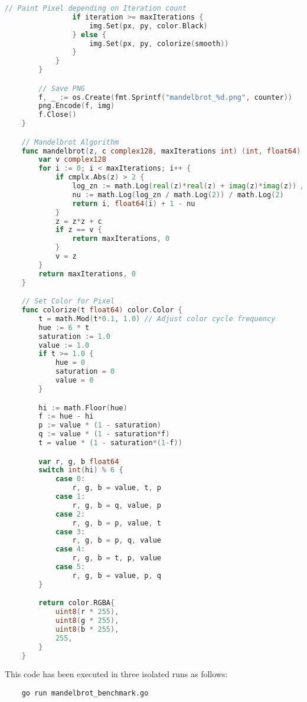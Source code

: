 \begin{lstlisting}[language=go, frame=tb, caption={Mandelbrot Set Calculation}]
                // Paint Pixel depending on Iteration count
                if iteration >= maxIterations {
                    img.Set(px, py, color.Black)
                } else {
                    img.Set(px, py, colorize(smooth))
                }
            }
        }

        // Save PNG
        f, _ := os.Create(fmt.Sprintf("mandelbrot_%d.png", counter))
        png.Encode(f, img)
        f.Close()
    }

    // Mandelbrot Algorithm
    func mandelbrot(z, c complex128, maxIterations int) (int, float64) {
        var v complex128
        for i := 0; i < maxIterations; i++ {
            if cmplx.Abs(z) > 2 {
                log_zn := math.Log(real(z)*real(z) + imag(z)*imag(z)) / 2
                nu := math.Log(log_zn / math.Log(2)) / math.Log(2)
                return i, float64(i) + 1 - nu
            }
            z = z*z + c
            if z == v {
                return maxIterations, 0
            }
            v = z
        }
        return maxIterations, 0
    }

    // Set Color for Pixel
    func colorize(t float64) color.Color {
        t = math.Mod(t*0.1, 1.0) // Adjust color cycle frequency
        hue := 6 * t
        saturation := 1.0
        value := 1.0
        if t >= 1.0 {
            hue = 0
            saturation = 0
            value = 0
        }

        hi := math.Floor(hue)
        f := hue - hi
        p := value * (1 - saturation)
        q := value * (1 - saturation*f)
        t = value * (1 - saturation*(1-f))

        var r, g, b float64
        switch int(hi) % 6 {
            case 0:
                r, g, b = value, t, p
            case 1:
                r, g, b = q, value, p
            case 2:
                r, g, b = p, value, t
            case 3:
                r, g, b = p, q, value
            case 4:
                r, g, b = t, p, value
            case 5:
                r, g, b = value, p, q
        }

        return color.RGBA{
            uint8(r * 255),
            uint8(g * 255),
            uint8(b * 255),
            255,
        }
    }    
\end{lstlisting}

This code has been executed in three isolated runs as follows:
\begin{lstlisting}
    go run mandelbrot_benchmark.go
\end{lstlisting}

